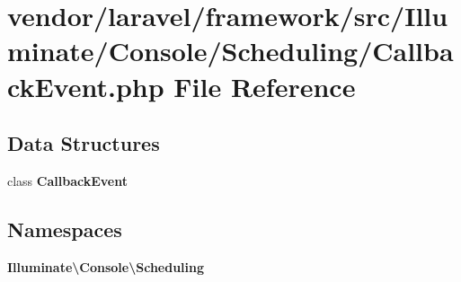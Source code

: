 \section{vendor/laravel/framework/src/\+Illuminate/\+Console/\+Scheduling/\+Callback\+Event.php File Reference}
\label{_callback_event_8php}
\subsection*{Data Structures}
\begin{DoxyCompactItemize}
\item 
class {\bf Callback\+Event}
\end{DoxyCompactItemize}
\subsection*{Namespaces}
\begin{DoxyCompactItemize}
\item 
 {\bf Illuminate\textbackslash{}\+Console\textbackslash{}\+Scheduling}
\end{DoxyCompactItemize}
